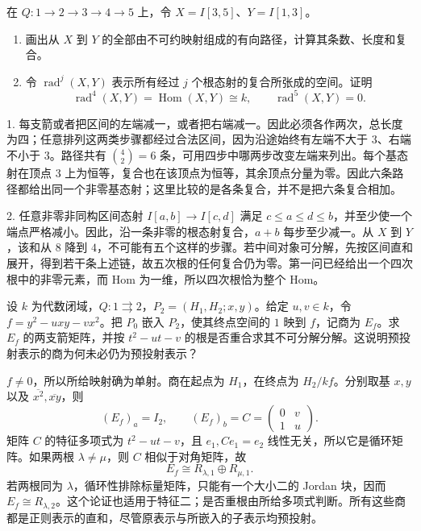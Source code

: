\begin{optionalexercise}\label{b5:ex:10-interval-radical-length}
	在 \(Q:1\to2\to3\to4\to5\) 上，令 \(X=I[3,5]\)、\(Y=I[1,3]\)。
	\begin{enumerate}
		\item 画出从 \(X\) 到 \(Y\) 的全部由不可约映射组成的有向路径，计算其条数、长度和复合。
		\item 令 \(\operatorname{rad}^j(X,Y)\) 表示所有经过 \(j\) 个根态射的复合所张成的空间。证明
		\[
			\operatorname{rad}^4(X,Y)=\operatorname{Hom}(X,Y)\cong k,
			\qquad\operatorname{rad}^5(X,Y)=0.
		\]
	\end{enumerate}
\end{optionalexercise}
\begin{solution}
	1. 每支箭或者把区间的左端减一，或者把右端减一。因此必须各作两次，总长度为四；任意排列这两类步骤都经过合法区间，因为沿途始终有左端不大于 \(3\)、右端不小于 \(3\)。路径共有 \(\binom42=6\) 条，可用四步中哪两步改变左端来列出。每个基态射在顶点 \(3\) 上为恒等，复合也在该顶点为恒等，其余顶点分量为零。因此六条路径都给出同一个非零基态射；这里比较的是各条复合，并不是把六条复合相加。

	2. 任意非零非同构区间态射 \(I[a,b]\to I[c,d]\) 满足 \(c\le a\le d\le b\)，并至少使一个端点严格减小。因此，沿一条非零的根态射复合，\(a+b\) 每步至少减一。从 \(X\) 到 \(Y\)，该和从 \(8\) 降到 \(4\)，不可能有五个这样的步骤。若中间对象可分解，先按区间直和展开，得到若干条上述链，故五次根的任何复合仍为零。第一问已经给出一个四次根中的非零元素，而 Hom 为一维，所以四次根恰为整个 Hom。
\end{solution}

\begin{optionalexercise}\label{b5:ex:10-preprojective-regular-quotient}
	设 \(k\) 为代数闭域，\(Q:1\rightrightarrows2\)，\(P_2=(H_1,H_2;x,y)\)。给定 \(u,v\in k\)，令 \(f=y^2-u xy-vx^2\)。把 \(P_0\) 嵌入 \(P_2\)，使其终点空间的 \(1\) 映到 \(f\)，记商为 \(E_f\)。求 \(E_f\) 的两支箭矩阵，并按 \(t^2-ut-v\) 的根是否重合求其不可分解分解。这说明预投射表示的商为何未必仍为预投射表示？
\end{optionalexercise}
\begin{solution}
	\(f\ne0\)，所以所给映射确为单射。商在起点为 \(H_1\)，在终点为 \(H_2/kf\)。分别取基 \(x,y\) 以及 \(\overline{x^2},\overline{xy}\)，则
	\[
		(E_f)_a=I_2,\qquad
		(E_f)_b=C=\begin{pmatrix}0&v\\1&u\end{pmatrix}.
	\]
	矩阵 \(C\) 的特征多项式为 \(t^2-ut-v\)，且 \(e_1,Ce_1=e_2\) 线性无关，所以它是循环矩阵。如果两根 \(\lambda\ne\mu\)，则 \(C\) 相似于对角矩阵，故
	\[
		E_f\cong R_{\lambda,1}\oplus R_{\mu,1}.
	\]
	若两根同为 \(\lambda\)，循环性排除标量矩阵，只能有一个大小二的 Jordan 块，因而 \(E_f\cong R_{\lambda,2}\)。这个论证也适用于特征二；是否重根由所给多项式判断。所有这些商都是正则表示的直和，尽管原表示与所嵌入的子表示均预投射。
\end{solution}

